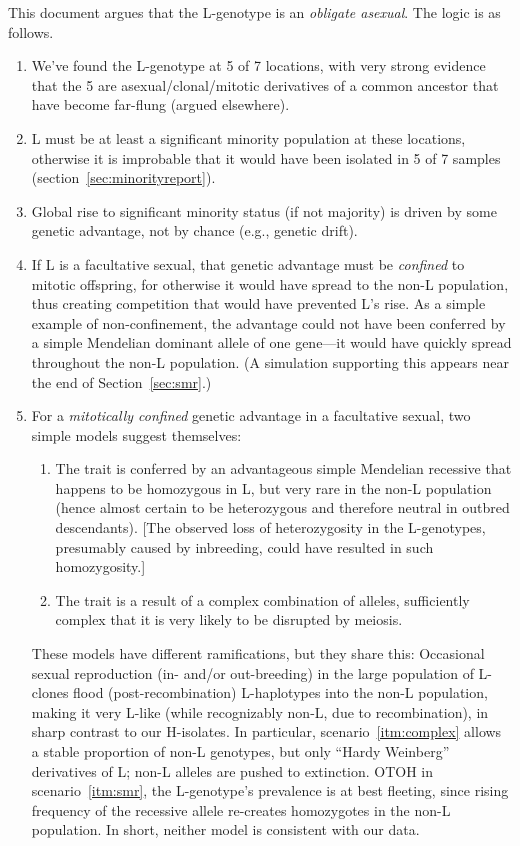 \documentclass{article}\usepackage[]{graphicx}\usepackage[]{color}
\begin{document}
This document argues that the L-genotype is an \emph{obligate asexual}.  The logic is as follows.
\begin{enumerate}
  \item We've found the L-genotype at 5 of 7 locations, with very strong evidence that the 5 are
    asexual/clonal/mitotic derivatives of a common ancestor that have become far-flung (argued
    elsewhere).

  \item L must be at least a significant minority population at these locations, otherwise it is
    improbable that it would have been isolated in 5 of 7 samples (section~\ref{sec:minorityreport}).

  \item Global rise to significant minority status (if not majority) is driven by some genetic
    advantage, not by chance (e.g., genetic drift).
  
  \item If L is a facultative sexual, that genetic advantage must be \emph{confined} to mitotic
    offspring, for otherwise it would have spread to the non-L population, thus creating competition
    that would have prevented L's rise.  As a simple example of non-confinement, the advantage could
    not have been conferred by a simple Mendelian dominant allele of one gene---it would have
    quickly spread throughout the non-L population.  (A simulation supporting this appears near the
    end of Section~\ref{sec:smr}.)

  \item For a \emph{mitotically confined} genetic advantage in a facultative sexual, two simple
    models suggest themselves:
    \begin{enumerate}
      \item\label{itm:smr} The trait is conferred by an advantageous simple Mendelian recessive that
        happens to be homozygous in L, but very rare in the non-L population (hence almost certain
        to be heterozygous and therefore neutral in outbred descendants).  [The observed loss of
        heterozygosity in the L-genotypes, presumably caused by inbreeding, could have resulted in
        such homozygosity.]
      \item\label{itm:complex} The trait is a result of a complex combination of alleles,
        sufficiently complex that it is very likely to be disrupted by meiosis.
    \end{enumerate}
    These models have different ramifications, but they share this: Occasional sexual reproduction
    (in- and/or out-breeding) in the large population of L-clones flood (post-recombination)
    L-haplotypes into the non-L population, making it very L-like (while recognizably non-L, due to
    recombination), in sharp contrast to our H-isolates.  In particular, scenario~\ref{itm:complex}
    allows a stable proportion of non-L genotypes, but only ``Hardy Weinberg'' derivatives of L;
    non-L alleles are pushed to extinction.  OTOH in scenario~\ref{itm:smr}, the L-genotype's
    prevalence is at best fleeting, since rising frequency of the recessive allele re-creates
    homozygotes in the non-L population.  In short, neither model is consistent with our data.
\end{enumerate}
\end{document}
